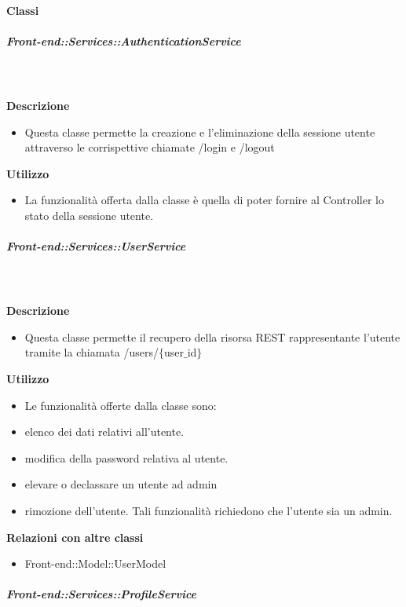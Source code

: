     \paragraph{Classi}
      \subparagraph{Front-end::Services::AuthenticationService}
        
        \textbf{\\ \\ Descrizione} 
          \begin{itemize}
            \item[] Questa classe permette la creazione e l'eliminazione della sessione utente attraverso le corrispettive chiamate /login e /logout
          \end{itemize}      
        \textbf{Utilizzo}  
          \begin{itemize}
            \item[] La funzionalità offerta dalla classe è quella di poter fornire al Controller lo stato della sessione utente.
          \end{itemize}
      \subparagraph{Front-end::Services::UserService}
        
        \textbf{\\ \\ Descrizione} 
          \begin{itemize}
            \item[] Questa classe permette il recupero della risorsa REST rappresentante l'utente tramite la chiamata /users/$\{$user$\_$id$\}$
          \end{itemize}      
        \textbf{Utilizzo}  
          \begin{itemize}
            \item[] Le funzionalità offerte dalla classe sono: 
          \end{itemize}
\begin{itemize} 
\item elenco dei dati relativi all'utente. 
\item modifica della password relativa al utente.
\item elevare o declassare un utente ad admin 
\item rimozione dell'utente. 
Tali funzionalità richiedono che l'utente sia un admin.
          \end{itemize}
          \textbf{Relazioni con altre classi}
          \begin{itemize}
              \item{Front-end::Model::UserModel}
          \end{itemize}
      \subparagraph{Front-end::Services::ProfileService}
        
